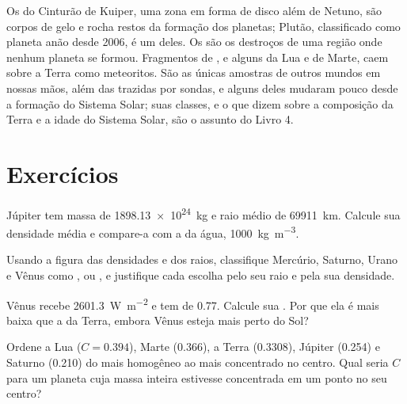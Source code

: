 Os  do Cinturão de Kuiper, uma zona em forma de disco além de Netuno, são corpos de gelo e rocha restos da formação dos planetas; Plutão, classificado como planeta anão desde 2006, é um deles. Os  são os destroços de uma região onde nenhum planeta se formou. Fragmentos de , e alguns da Lua e de Marte, caem sobre a Terra como meteoritos. São as únicas amostras de outros mundos em nossas mãos, além das trazidas por sondas, e alguns deles mudaram pouco desde a formação do Sistema Solar; suas classes, e o que dizem sobre a composição da Terra e a idade do Sistema Solar, são o assunto do Livro 4.

\section{Exercícios}

\begin{exercise}[$\star$]\label{exo:b1:comparative-planetology:1}
Júpiter tem massa de \qty{1898.13e24}{kg} e raio médio de \qty{69911}{km}. Calcule sua densidade média e compare-a com a da água, \qty{1000}{kg.m^{-3}}.
\end{exercise}

\begin{exercise}[$\star$]\label{exo:b1:comparative-planetology:2}
Usando a figura das densidades e dos raios, classifique Mercúrio, Saturno, Urano e Vênus como ,  ou , e justifique cada escolha pelo seu raio e pela sua densidade.
\end{exercise}

\begin{exercise}[$\star$]\label{exo:b1:comparative-planetology:3}
Vênus recebe \qty{2601.3}{W.m^{-2}} e tem  de 0.77. Calcule sua . Por que ela é mais baixa que a da Terra, embora Vênus esteja mais perto do Sol?
\end{exercise}

\begin{exercise}[$\star$]\label{exo:b1:comparative-planetology:4}
Ordene a Lua ($C = 0.394$), Marte (0.366), a Terra (0.3308), Júpiter (0.254) e Saturno (0.210) do mais homogêneo ao mais concentrado no centro. Qual seria $C$ para um planeta cuja massa inteira estivesse concentrada em um ponto no seu centro?
\end{exercise}

